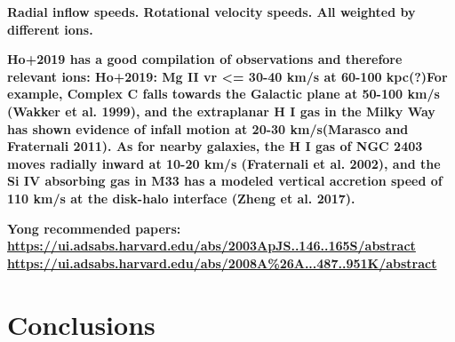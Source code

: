 \documentclass[fleqn,usenatbib]{mnras}
\begin{document}
\textbf{
Radial inflow speeds.
Rotational velocity speeds.
All weighted by different ions.
}

\textbf{
Ho+2019 has a good compilation of observations and therefore relevant ions:
Ho+2019:
Mg II vr <= 30-40 km/s at 60-100 kpc(?)For example, Complex C falls towards the Galactic plane at 50-100 km/s (Wakker et al. 1999), and the extraplanar H I gas in the Milky Way has shown evidence of infall motion at 20-30 km/s(Marasco and Fraternali 2011).
As for nearby galaxies, the H I gas of NGC 2403 moves radially inward at 10-20 km/s (Fraternali et al. 2002), and the Si IV absorbing gas in M33 has a modeled vertical accretion speed of 110 km/s at the disk-halo interface (Zheng et al. 2017).
}

\textbf{
Yong recommended papers:
\url{https://ui.adsabs.harvard.edu/abs/2003ApJS..146..165S/abstract}
\url{https://ui.adsabs.harvard.edu/abs/2008A\%26A...487..951K/abstract}
}

\section{Conclusions}
\label{s: conclusions}
\end{document}
